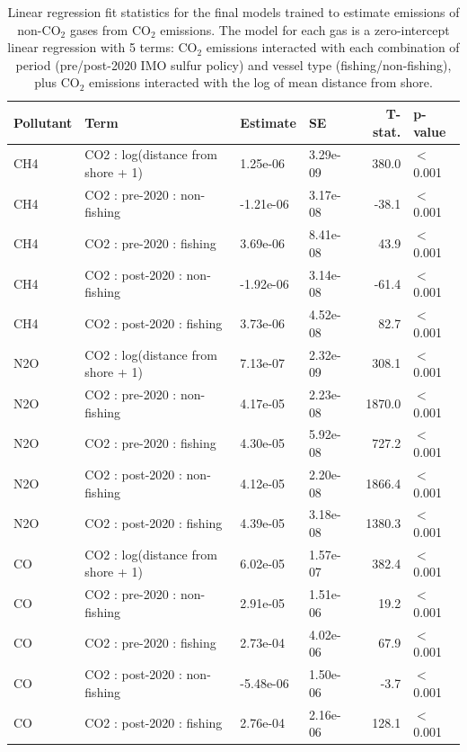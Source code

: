 \begin{table}[!h]
\centering
\caption{\label{tab:lm_other_gases_tidy_fit_stats}Linear regression fit statistics for the final models trained to estimate emissions of non-CO$_2$ gases from CO$_2$ emissions. The model for each gas is a zero-intercept linear regression with 5 terms: CO$_2$ emissions interacted with each combination of period (pre/post-2020 IMO sulfur policy) and vessel type (fishing/non-fishing), plus CO$_2$ emissions interacted with the log of mean distance from shore.}
\centering
\fontsize{7}{9}\selectfont
\begin{tabular}[t]{l|l|l|l|r|l}
\hline
Pollutant & Term & Estimate & SE & T-stat. & p-value\\
\hline
CH4 & CO2 : log(distance from shore + 1) & 1.25e-06 & 3.29e-09 & 380.0 & $<$0.001\\
\hline
CH4 & CO2 : pre-2020 : non-fishing & -1.21e-06 & 3.17e-08 & -38.1 & $<$0.001\\
\hline
CH4 & CO2 : pre-2020 : fishing & 3.69e-06 & 8.41e-08 & 43.9 & $<$0.001\\
\hline
CH4 & CO2 : post-2020 : non-fishing & -1.92e-06 & 3.14e-08 & -61.4 & $<$0.001\\
\hline
CH4 & CO2 : post-2020 : fishing & 3.73e-06 & 4.52e-08 & 82.7 & $<$0.001\\
\hline
N2O & CO2 : log(distance from shore + 1) & 7.13e-07 & 2.32e-09 & 308.1 & $<$0.001\\
\hline
N2O & CO2 : pre-2020 : non-fishing & 4.17e-05 & 2.23e-08 & 1870.0 & $<$0.001\\
\hline
N2O & CO2 : pre-2020 : fishing & 4.30e-05 & 5.92e-08 & 727.2 & $<$0.001\\
\hline
N2O & CO2 : post-2020 : non-fishing & 4.12e-05 & 2.20e-08 & 1866.4 & $<$0.001\\
\hline
N2O & CO2 : post-2020 : fishing & 4.39e-05 & 3.18e-08 & 1380.3 & $<$0.001\\
\hline
CO & CO2 : log(distance from shore + 1) & 6.02e-05 & 1.57e-07 & 382.4 & $<$0.001\\
\hline
CO & CO2 : pre-2020 : non-fishing & 2.91e-05 & 1.51e-06 & 19.2 & $<$0.001\\
\hline
CO & CO2 : pre-2020 : fishing & 2.73e-04 & 4.02e-06 & 67.9 & $<$0.001\\
\hline
CO & CO2 : post-2020 : non-fishing & -5.48e-06 & 1.50e-06 & -3.7 & $<$0.001\\
\hline
CO & CO2 : post-2020 : fishing & 2.76e-04 & 2.16e-06 & 128.1 & $<$0.001\\

\end{tabular}
\end{table}
